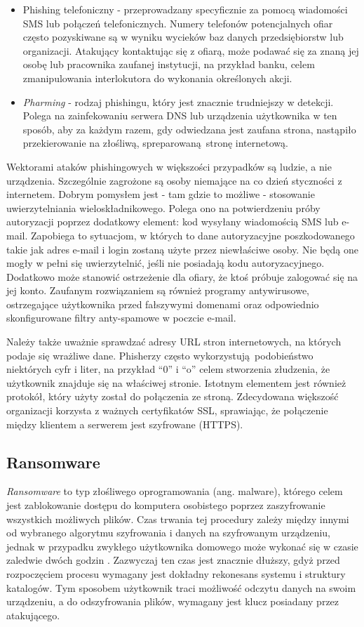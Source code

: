 \documentclass[12pt,twoside]{article}
\begin{document}
\begin{itemize}
	 \item Phishing telefoniczny - przeprowadzany specyficznie za pomocą wiadomości SMS lub połączeń telefonicznych. Numery telefonów potencjalnych ofiar często pozyskiwane są w wyniku wycieków baz danych przedsiębiorstw lub organizacji. Atakujący kontaktując się z ofiarą, może podawać się za znaną jej osobę lub pracownika zaufanej instytucji, na przykład banku, celem zmanipulowania interlokutora do wykonania określonych akcji.
	 \item \emph{Pharming} - rodzaj phishingu, który jest znacznie trudniejszy w detekcji. Polega na zainfekowaniu serwera DNS lub urządzenia użytkownika w ten sposób, aby za każdym razem, gdy odwiedzana jest zaufana strona, nastąpiło przekierowanie na złośliwą, spreparowaną stronę internetową. 

\end{itemize}

Wektorami ataków phishingowych w większości przypadków są ludzie, a nie urządzenia. Szczególnie zagrożone są osoby niemające na co dzień styczności z internetem. Dobrym pomysłem jest - tam gdzie to możliwe - stosowanie uwierzytelniania wieloskładnikowego. Polega ono na potwierdzeniu próby autoryzacji poprzez dodatkowy element: kod wysyłany wiadomością SMS lub e-mail. Zapobiega to sytuacjom, w których to dane autoryzacyjne poszkodowanego takie jak adres e-mail i login zostaną użyte przez niewłaściwe osoby. Nie będą one mogły w pełni się uwierzytelnić, jeśli nie posiadają kodu autoryzacyjnego. Dodatkowo może stanowić ostrzeżenie dla ofiary, że ktoś próbuje zalogować się na jej konto. Zaufanym rozwiązaniem są również programy antywirusowe, ostrzegające użytkownika przed fałszywymi domenami oraz odpowiednio skonfigurowane filtry anty-spamowe w poczcie e-mail.

Należy także uważnie sprawdzać adresy URL stron internetowych, na których podaje się wrażliwe dane. Phisherzy często wykorzystują podobieństwo niektórych cyfr i liter, na przykład ``0'' i ``o'' celem stworzenia złudzenia, że użytkownik znajduje się na właściwej stronie. Istotnym elementem jest również protokół, który użyty został do połączenia ze stroną. Zdecydowana większość organizacji korzysta z ważnych certyfikatów SSL, sprawiając, że połączenie między klientem a serwerem jest szyfrowane (HTTPS).

\clearpage
\subsection{Ransomware}
\emph{Ransomware} to typ złośliwego oprogramowania (ang. malware), którego celem jest zablokowanie dostępu do komputera osobistego poprzez zaszyfrowanie wszystkich możliwych plików. Czas trwania tej procedury zależy między innymi od wybranego algorytmu szyfrowania i danych na szyfrowanym urządzeniu, jednak w przypadku zwykłego użytkownika domowego może wykonać się w czasie zaledwie dwóch godzin \cite{RansomwareTime}. Zazwyczaj ten czas jest znacznie dłuższy, gdyż przed rozpoczęciem procesu wymagany jest dokładny rekonesans systemu i struktury katalogów. Tym sposobem użytkownik traci możliwość odczytu danych na swoim urządzeniu, a do odszyfrowania plików, wymagany jest klucz posiadany przez atakującego. 
\end{document}
